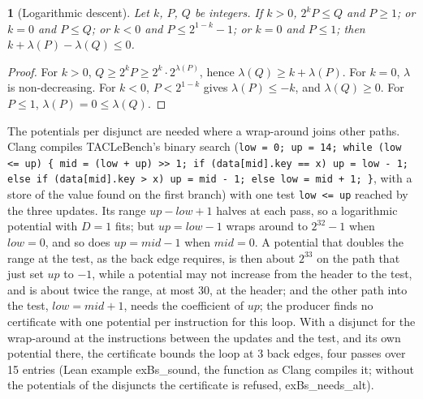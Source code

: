 \documentclass[oneside,english]{amsart}
\numberwithin{equation}{section}
\theoremstyle{plain}
\theoremstyle{definition}
\theoremstyle{plain}
\theoremstyle{plain}
\newtheorem{lem}[thm]{\protect\lemmaname}
\theoremstyle{remark}
\newcommand{\lean}[1]{{\ttfamily\small #1}}
\providecommand{\lemmaname}{Lemma}
\begin{document}
\begin{lem}[Logarithmic descent]
\label{lem:log-descent}
Let $k$, $P$, $Q$ be integers. If $k > 0$, $2^{k} P \le Q$ and $P \ge 1$; or $k = 0$ and $P \le Q$; or $k < 0$ and $P \le 2^{1 - k} - 1$; or $k = 0$ and $P \le 1$; then $k + \lambda(P) - \lambda(Q) \le 0$.
\end{lem}

\begin{proof}
For $k > 0$, $Q \ge 2^{k} P \ge 2^{k} \cdot 2^{\lambda(P)}$, hence $\lambda(Q) \ge k + \lambda(P)$. For $k = 0$, $\lambda$ is non-decreasing. For $k < 0$, $P < 2^{1 - k}$ gives $\lambda(P) \le -k$, and $\lambda(Q) \ge 0$. For $P \le 1$, $\lambda(P) = 0 \le \lambda(Q)$.
\end{proof}

The potentials per disjunct are needed where a wrap-around joins other paths. Clang compiles TACLeBench's binary search (\texttt{low = 0; up = 14; while (low <= up) \{ mid = (low + up) >> 1; if (data[mid].key == x) up = low - 1; else if (data[mid].key > x) up = mid - 1; else low = mid + 1; \}}, with a store of the value found on the first branch) with one test \texttt{low <= up} reached by the three updates. Its range $\mathit{up} - \mathit{low} + 1$ halves at each pass, so a logarithmic potential with $D = 1$ fits; but $\mathit{up} = \mathit{low} - 1$ wraps around to $2^{32} - 1$ when $\mathit{low} = 0$, and so does $\mathit{up} = \mathit{mid} - 1$ when $\mathit{mid} = 0$. A potential that doubles the range at the test, as the back edge requires, is then about $2^{33}$ on the path that just set $\mathit{up}$ to $-1$, while a potential may not increase from the header to the test, and is about twice the range, at most $30$, at the header; and the other path into the test, $\mathit{low} = \mathit{mid} + 1$, needs the coefficient of $\mathit{up}$; the producer finds no certificate with one potential per instruction for this loop. With a disjunct for the wrap-around at the instructions between the updates and the test, and its own potential there, the certificate bounds the loop at 3 back edges, four passes over 15 entries (Lean example \lean{exBs\_\allowbreak sound}, the function as Clang compiles it; without the potentials of the disjuncts the certificate is refused, \lean{exBs\_\allowbreak needs\_\allowbreak alt}).
\end{document}
